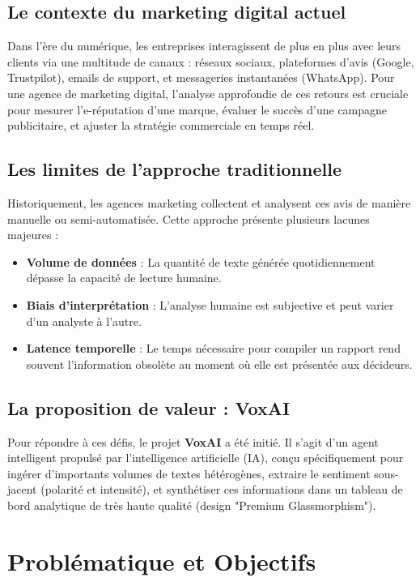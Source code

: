 \documentclass[12pt,a4paper]{article}
\begin{document}
\subsection{Le contexte du marketing digital actuel}
Dans l'ère du numérique, les entreprises interagissent de plus en plus avec leurs clients via une multitude de canaux : réseaux sociaux, plateformes d'avis (Google, Trustpilot), emails de support, et messageries instantanées (WhatsApp). Pour une agence de marketing digital, l'analyse approfondie de ces retours est cruciale pour mesurer l'e-réputation d'une marque, évaluer le succès d'une campagne publicitaire, et ajuster la stratégie commerciale en temps réel.

\subsection{Les limites de l'approche traditionnelle}
Historiquement, les agences marketing collectent et analysent ces avis de manière manuelle ou semi-automatisée. Cette approche présente plusieurs lacunes majeures :
\begin{itemize}
    \item \textbf{Volume de données} : La quantité de texte générée quotidiennement dépasse la capacité de lecture humaine.
    \item \textbf{Biais d'interprétation} : L'analyse humaine est subjective et peut varier d'un analyste à l'autre.
    \item \textbf{Latence temporelle} : Le temps nécessaire pour compiler un rapport rend souvent l'information obsolète au moment où elle est présentée aux décideurs.
\end{itemize}

\subsection{La proposition de valeur : VoxAI}
Pour répondre à ces défis, le projet \textbf{VoxAI} a été initié. Il s'agit d'un agent intelligent propulsé par l'intelligence artificielle (IA), conçu spécifiquement pour ingérer d'importants volumes de textes hétérogènes, extraire le sentiment sous-jacent (polarité et intensité), et synthétiser ces informations dans un tableau de bord analytique de très haute qualité (design "Premium Glassmorphism").
\newpage

\section{Problématique et Objectifs}
\end{document}
